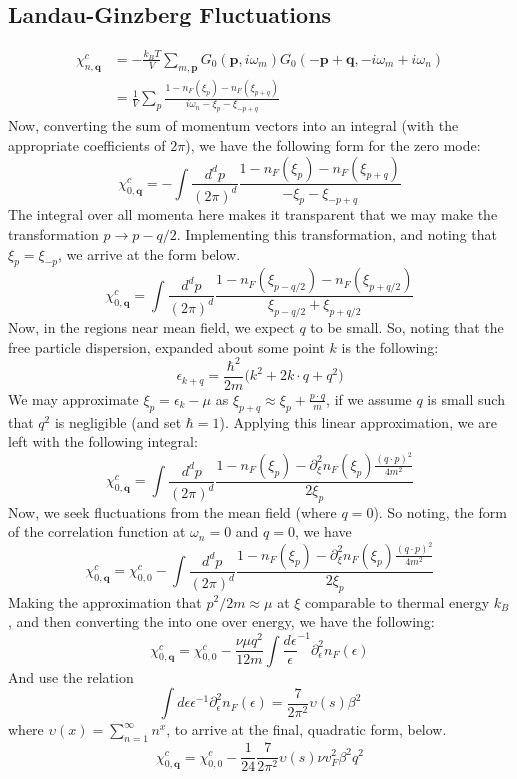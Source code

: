 \documentclass[10pt,a4paper]{article}
\begin{document}
\begin{multicols}{2}
\section{Landau-Ginzberg Fluctuations}
\small
\begin{align*}
\chi_{n,\mathbf{q}}^c &= -\frac{k_BT}{V}\sum_{m,\mathbf{p}}G_{0}(\mathbf{p},i\omega_m)G_0(-\mathbf{p}+\mathbf{q},-i\omega_m+i\omega_n)\\
&=\frac{1}{V}\sum_p\frac{1-n_F(\xi_{p})-n_F(\xi_{p+q})}{i\omega_n-\xi_p-\xi_{-p+q}}
\end{align*}\normalsize
Now, converting the sum of momentum vectors into an integral (with the appropriate coefficients of $2\pi$), we have the following form for the zero
mode:
$$
\chi_{0,\mathbf{q}}^c = -\int \frac{d^d p}{(2\pi)^d}\frac{1-n_F(\xi_{p})-n_F(\xi_{p+q})}{-\xi_p-\xi_{-p+q}}
$$
The integral over all momenta here makes it transparent that we may make the 
transformation $p\rightarrow p-q/2$. Implementing this transformation, and noting that $\xi_p=\xi_{-p}$, we arrive at the form below.
$$
\chi_{0,\mathbf{q}}^c = \int \frac{d^d p}{(2\pi)^d}\frac{1-n_F(\xi_{p-q/2})-n_F(\xi_{p+q/2})}{\xi_{p-q/2}+\xi_{p+q/2}}
$$
Now, in the regions near mean field, we expect $q$ to be small. So, noting that the free particle dispersion, expanded about some point $k$ is the following:
$$
\epsilon_{k+q}=\frac{\hbar^2}{2m}\big(k^2+2k\cdot q + q^2 \big)
$$
We may approximate $\xi_p=\epsilon_k -\mu$ as $\xi_{p+q}\approx \xi_p + \frac{p\cdot q}{m}$, if we assume $q$ is small such that $q^2$ is negligible (and set $\hbar=1$). Applying this linear approximation, we are left with the following integral:
$$
\chi_{0,\mathbf{q}}^c = \int \frac{d^d p}{(2\pi)^d}\frac{1-n_F(\xi_{p})-\partial_{\xi}^2n_F(\xi_p)\frac{(q\cdot p)^2}{4m^2}}{2\xi_{p}}
$$
Now, we seek fluctuations from the mean field (where $q=0$). So noting, the form of the correlation function at $\omega_n=0$ and $q=0$, we have
$$
\chi_{0,\mathbf{q}}^c = \chi_{0,0}^c-\int \frac{d^d p}{(2\pi)^d}\frac{1-n_F(\xi_{p})-\partial_{\xi}^2n_F(\xi_p)\frac{(q\cdot p)^2}{4m^2}}{2\xi_{p}}
$$
Making the approximation that $p^2/2m\approx \mu$ at $\xi$ comparable to thermal energy $k_B$, and then converting the into one over energy, we have the following:
$$
\chi_{0,\mathbf{q}}^c = \chi_{0,0}^c-\frac{\nu \mu q^2}{12 m}\int \frac{d\epsilon}\epsilon^{-1} \partial^2_{\epsilon}n_F(\epsilon)
$$
And use the relation
$$
\int d\epsilon \epsilon^{-1}\partial_{\epsilon}^2 n_F(\epsilon) =\frac{7}{2\pi^2}\upsilon(s)\beta^{2}
$$
where $\upsilon(x)=\sum_{n=1}^{\infty}n^x$, to arrive at the final, quadratic form, below.
$$
\chi_{0,\mathbf{q}}^c = \chi_{0,0}^c-\frac{1}{24}\frac{7}{2\pi^2}\upsilon(s)\nu v_F^2\beta^{2}q^2
$$
\end{multicols}
\end{document}

